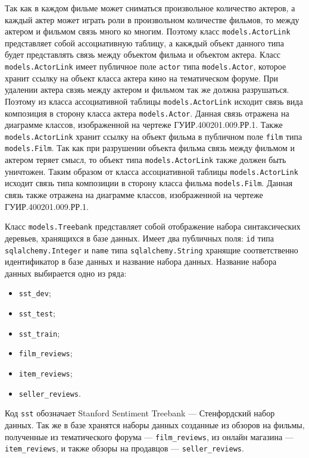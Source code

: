 Так как в каждом фильме может сниматься произвольное количество актеров, а каждый актер может играть роли в произвольном количестве фильмов, то между актером и фильмом связь много ко многим. Поэтому класс \texttt{models.ActorLink} представляет собой ассоциативную таблицу, а какждый объект данного типа будет представлять связь между объектом фильма и объектом актера. Класс \texttt{models.ActorLink} имеет публичное поле \texttt{actor} типа \texttt{models.Actor}, которое хранит ссылку на объект класса актера кино на тематическом форуме. При удалении актера свзяь между актером и фильмом так же должна разрушаться. Поэтому из класса ассоциативной таблицы \texttt{models.\-ActorLink} исходит связь вида композиция в сторону класса актера \texttt{models.\-Actor}. Данная связь отражена на диаграмме классов, изображенной на чертеже ГУИР.400201.009.РР.1. Также \texttt{models.ActorLink} хранит ссылку на объект фильма в публичном поле \texttt{film} типа \texttt{models.Film}. Так как при разрушении объекта фильма связь между фильмом и актером теряет смысл, то объект типа \texttt{models.ActorLink} также должен быть уничтожен. Таким образом от класса ассоциативной таблицы \texttt{models.ActorLink} исходит связь типа композиции в сторону класса фильма \texttt{models.Film}. Данная связь также отражена на диаграмме классов, изображенной на чертеже ГУИР.400201.009.РР.1.

Класс \texttt{models.Treebank} представляет собой отображение набора синтаксических деревьев, хранящихся в базе данных. Имеет два публичных поля: \texttt{id} типа \texttt{sqlalchemy.Integer} и \texttt{name} типа \texttt{sqlalchemy.String} хранящие соответственно идентификатор в базе данных и название набора данных. Название набора данных выбирается одно из ряда:
\begin{itemize}
\item \texttt{sst\_dev};
\item \texttt{sst\_test};
\item \texttt{sst\_train};
\item \texttt{film\_reviews};
\item \texttt{item\_reviews};
\item \texttt{seller\_reviews}.
\end{itemize}
Код \texttt{sst} обозначает Stanford Sentiment Treebank --- Стенфордский набор данных. Так же в базе хранятся наборы данных созданные из обзоров на фильмы, полученные из тематического форума --- \texttt{film\_reviews}, из онлайн магазина --- \texttt{item\_reviews}, и также обзоры на продавцов --- \texttt{seller\_reviews}.

